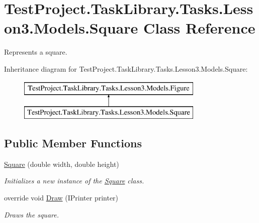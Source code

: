 \hypertarget{class_test_project_1_1_task_library_1_1_tasks_1_1_lesson3_1_1_models_1_1_square}{}\section{Test\+Project.\+Task\+Library.\+Tasks.\+Lesson3.\+Models.\+Square Class Reference}
\label{class_test_project_1_1_task_library_1_1_tasks_1_1_lesson3_1_1_models_1_1_square}


Represents a square.  


Inheritance diagram for Test\+Project.\+Task\+Library.\+Tasks.\+Lesson3.\+Models.\+Square\+:\begin{figure}[H]
\begin{center}
\leavevmode
\includegraphics[height=2.000000cm]{class_test_project_1_1_task_library_1_1_tasks_1_1_lesson3_1_1_models_1_1_square}
\end{center}
\end{figure}
\subsection*{Public Member Functions}
\begin{DoxyCompactItemize}
\item 
\mbox{\hyperlink{class_test_project_1_1_task_library_1_1_tasks_1_1_lesson3_1_1_models_1_1_square_a420f7744d842fff348d12d3cacd6cd25}{Square}} (double width, double height)
\begin{DoxyCompactList}\small\item\em Initializes a new instance of the \mbox{\hyperlink{class_test_project_1_1_task_library_1_1_tasks_1_1_lesson3_1_1_models_1_1_square}{Square}} class. \end{DoxyCompactList}\item 
override void \mbox{\hyperlink{class_test_project_1_1_task_library_1_1_tasks_1_1_lesson3_1_1_models_1_1_square_a7dc600c3d04a796aeddfa93477422de7}{Draw}} (I\+Printer printer)
\begin{DoxyCompactList}\small\item\em Draws the square. \end{DoxyCompactList}\end{DoxyCompactItemize}
